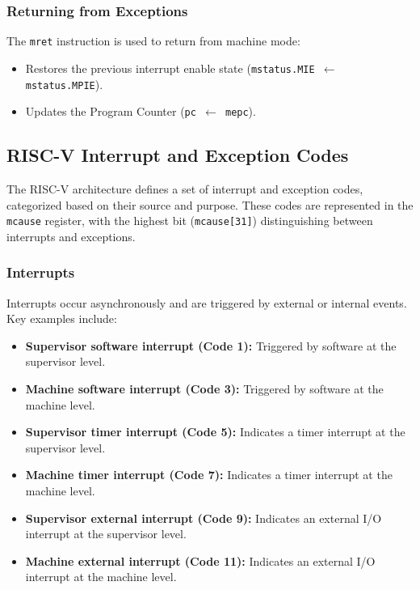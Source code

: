 \subsubsection{Returning from Exceptions}
The \texttt{mret} instruction is used to return from machine mode:
\begin{itemize}
    \item Restores the previous interrupt enable state (\texttt{mstatus.MIE $\leftarrow$ mstatus.MPIE}).
    \item Updates the Program Counter (\texttt{pc $\leftarrow$ mepc}).
\end{itemize}

\subsection{RISC-V Interrupt and Exception Codes}

The RISC-V architecture defines a set of interrupt and exception codes, categorized based on their source and purpose. These codes are represented in the \texttt{mcause} register, with the highest bit (\texttt{mcause[31]}) distinguishing between interrupts and exceptions.

\subsubsection*{Interrupts}
Interrupts occur asynchronously and are triggered by external or internal events. Key examples include:
\begin{itemize}
    \item \textbf{Supervisor software interrupt (Code 1):} Triggered by software at the supervisor level.
    \item \textbf{Machine software interrupt (Code 3):} Triggered by software at the machine level.
    \item \textbf{Supervisor timer interrupt (Code 5):} Indicates a timer interrupt at the supervisor level.
    \item \textbf{Machine timer interrupt (Code 7):} Indicates a timer interrupt at the machine level.
    \item \textbf{Supervisor external interrupt (Code 9):} Indicates an external I/O interrupt at the supervisor level.
    \item \textbf{Machine external interrupt (Code 11):} Indicates an external I/O interrupt at the machine level.
\end{itemize}

